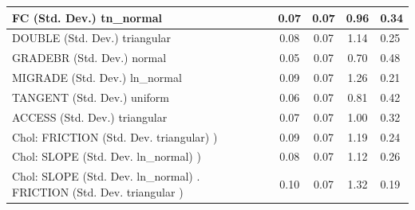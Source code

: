 \begin{table}
\begin{center}
\begin{tabular}{|l|l|c|c|c|l|}
			\hline
			FC (Std. Dev.) tn_normal &  & 0.07 & 0.07 & 0.96 & 0.34 \\
			\hline
			DOUBLE (Std. Dev.) triangular &  & 0.08 & 0.07 & 1.14 & 0.25 \\
			\hline
			GRADEBR (Std. Dev.) normal &  & 0.05 & 0.07 & 0.70 & 0.48 \\
			\hline
			MIGRADE (Std. Dev.) ln_normal &  & 0.09 & 0.07 & 1.26 & 0.21 \\
			\hline
			TANGENT (Std. Dev.) uniform &  & 0.06 & 0.07 & 0.81 & 0.42 \\
			\hline
			ACCESS (Std. Dev.) triangular &  & 0.07 & 0.07 & 1.00 & 0.32 \\
			\hline
			 Chol: FRICTION (Std. Dev. triangular) ) &  & 0.09 & 0.07 & 1.19 & 0.24 \\
			\hline
			 Chol: SLOPE (Std. Dev. ln_normal) ) &  & 0.08 & 0.07 & 1.12 & 0.26 \\
			\hline
			 Chol: SLOPE (Std. Dev. ln_normal) . FRICTION (Std. Dev.   triangular ) &  & 0.10 & 0.07 & 1.32 & 0.19 \\
			\hline
		\end{tabular}
	\end{center}
\end{table}